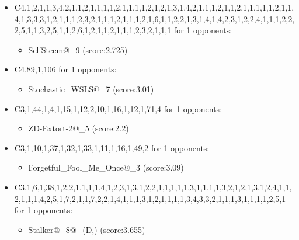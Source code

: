 \begin{appendices}
\begin{itemize}
        \item C4,1,2,1,1,3,4,2,1,1,2,1,1,1,1,2,1,1,1,1,2,1,2,1,3,1,4,2,1,1,1,2,1,1,2,1,1,1,1,1,2,1,1,4,1,3,3,3,1,2,1,1,1,2,3,2,1,1,1,2,1,1,1,2,1,6,1,1,2,2,1,3,1,4,1,4,2,3,1,2,2,4,1,1,1,2,2,2,5,1,1,3,2,5,1,1,2,6,1,2,1,1,2,1,1,1,2,3,2,1,1,1 for 1 opponents:
        \begin{multicols}{3}
            \begin{itemize}
                \item SelfSteem@\_9 (score:2.725)
            \end{itemize}
        \end{multicols}

        \item C4,89,1,106 for 1 opponents:
        \begin{multicols}{3}
            \begin{itemize}
                \item Stochastic\_WSLS@\_7 (score:3.01)
            \end{itemize}
        \end{multicols}

        \item C3,1,44,1,4,1,15,1,12,2,10,1,16,1,12,1,71,4 for 1 opponents:
        \begin{multicols}{3}
            \begin{itemize}
                \item ZD-Extort-2@\_5 (score:2.2)
            \end{itemize}
        \end{multicols}

        \item C3,1,10,1,37,1,32,1,33,1,11,1,16,1,49,2 for 1 opponents:
        \begin{multicols}{3}
            \begin{itemize}
                \item Forgetful\_Fool\_Me\_Once@\_3 (score:3.09)
            \end{itemize}
        \end{multicols}

        \item C3,1,6,1,38,1,2,2,1,1,1,1,4,1,2,3,1,3,1,2,2,1,1,1,1,1,3,1,1,1,1,3,2,1,2,1,3,1,2,4,1,1,2,1,1,1,4,2,5,1,7,2,1,1,7,2,2,1,4,1,1,1,3,1,2,1,1,1,1,3,4,3,3,2,1,1,1,3,1,1,1,1,2,5,1 for 1 opponents:
        \begin{multicols}{3}
            \begin{itemize}
                \item Stalker@\_8@\_(D,) (score:3.655)
            \end{itemize}
        \end{multicols}


\end{itemize}
\end{appendices}
